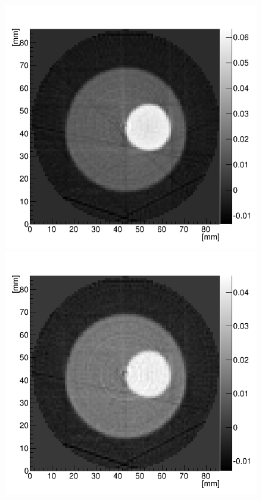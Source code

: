 \begin{figure}[H]
 \begin{minipage}{0.5\hsize}
  \begin{center}
 \includegraphics[bb=0.000000 0.000000 596.000000 574.000000,width=1\hsize]{image2/chapter5/image1_back.png} 
  \end{center}
 \end{minipage}
 \begin{minipage}{0.5\hsize}
  \begin{center}
 \includegraphics[bb=0.000000 0.000000 596.000000 574.000000,width=1\hsize]{image2/chapter5/image2_back.png} 

\end{center}
\end{minipage}
\end{figure}
